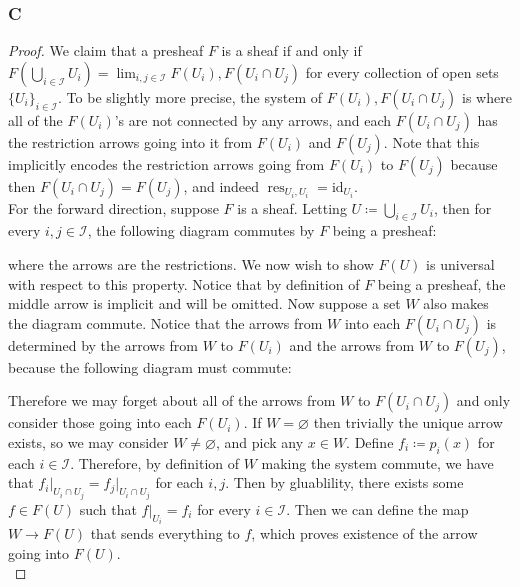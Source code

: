 \documentclass{article}
\newcommand{\id}{\mathrm{id}}
\newcommand{\fI}{\mathscr{I}}
\DeclareMathOperator{\res}{res}
\let\emptyset\varnothing
\begin{document}
\subsubsection{C}\label{2.2.C}
\begin{proof}
    We claim that a presheaf $F$ is a sheaf if and only if $F(\bigcup_{i\in \fI}U_i)=\lim_{i,j\in \fI} F(U_i),F(U_i\cap U_j)$ for every collection of open sets $\{U_i\}_{i\in \fI}$. To be slightly more precise, the system of $F(U_i),F(U_i\cap U_j)$ is where all of the $F(U_i)$'s are not connected by any arrows, and each $F(U_i\cap U_j)$ has the restriction arrows going into it from $F(U_i)$ and $F(U_j)$. Note that this implicitly encodes the restriction arrows going from $F(U_i)$ to $F(U_j)$ because then $F(U_i\cap U_j)=F(U_j)$, and indeed $\res_{U_i,U_i}=\id_{U_i}$.\\
    For the forward direction, suppose $F$ is a sheaf. Letting $U\coloneqq \bigcup_{i\in \fI} U_i$, then for every $i,j\in \fI$, the following diagram commutes by $F$ being a presheaf:
   \begin{center}
   \end{center}
   where the arrows are the restrictions. We now wish to show $F(U)$ is universal with respect to this property. Notice that by definition of $F$ being a presheaf, the middle arrow is implicit and will be omitted. Now suppose a set $W$ also makes the diagram commute. Notice that the arrows from $W$ into each $F(U_i\cap U_j)$ is determined by the arrows from $W$ to $F(U_i)$ and the arrows from $W$ to $F(U_j)$, because the following diagram must commute:
   \begin{center}
   \end{center}
   Therefore we may forget about all of the arrows from $W$ to $F(U_i\cap U_j)$ and only consider those going into each $F(U_i)$. If $W=\emptyset$ then trivially the unique arrow exists, so we may consider $W\ne \emptyset$, and pick any $x\in W$. Define $f_i\coloneqq p_i(x)$ for each $i\in \fI$. Therefore, by definition of $W$ making the system commute, we have that $f_i\vert_{U_i\cap U_j}=f_j\vert_{U_i\cap U_j}$ for each $i,j$. Then by gluablility, there exists some $f\in F(U)$ such that $f\vert_{U_i}=f_i$ for every $i\in \fI$. Then we can define the map $W\to F(U)$ that sends everything to $f$, which proves existence of the arrow going into $F(U)$.\\

\end{proof}
\end{document}
